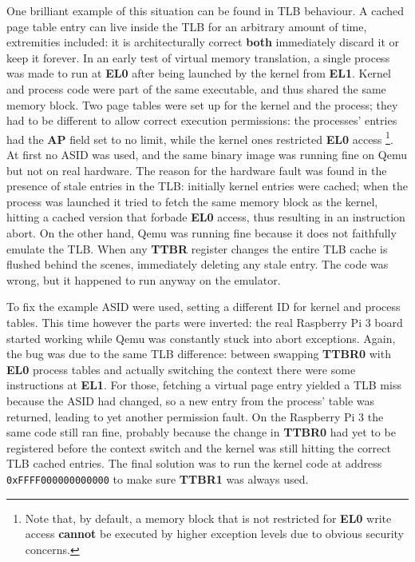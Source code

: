 \documentclass[12pt,a4paper,openright,twoside]{report}
\begin{document}
One brilliant example of this situation can be found in TLB behaviour. A cached
page table entry can live inside the TLB for an arbitrary amount of time, extremities
included: it is architecturally correct \textbf{both} immediately discard it or 
keep it forever. 
In an early test of virtual memory translation, a single process was made to run
at \textbf{EL0} after being launched by the kernel from \textbf{EL1}. Kernel and
process code were part of the same executable, and thus shared the same memory block.
Two page tables were set up for the kernel and the process; they had to be different
to allow correct execution permissions: the processes' entries had the \textbf{AP}
field set to no limit, while the kernel ones restricted \textbf{EL0} access 
\footnote{Note that, by default, a memory block that is not restricted for 
\textbf{EL0} write access \textbf{cannot} be executed by higher exception levels
due to obvious security concerns.}.
At first no ASID was used, and the same binary image was running fine on Qemu 
but not on real hardware. The reason for the hardware fault was found in the presence
of stale entries in the TLB: initially kernel entries were cached; when the process
was launched it tried to fetch the same memory block as the kernel, hitting a
cached version that forbade \textbf{EL0} access, thus resulting in an instruction
abort.
On the other hand, Qemu was running fine because it does not faithfully emulate
the TLB. When any \textbf{TTBR} register changes the entire TLB cache is flushed
behind the scenes, immediately deleting any stale entry.
The code was wrong, but it happened to run anyway on the emulator.

To fix the example ASID were used, setting a different ID for kernel and process
tables. This time however the parts were inverted: the real Raspberry Pi 3 board
started working while Qemu was constantly stuck into abort exceptions.
Again, the bug was due to the same TLB difference: between swapping \textbf{TTBR0}
with \textbf{EL0} process tables and actually switching the context there were 
some instructions at \textbf{EL1}. For those, fetching a virtual page entry 
yielded a TLB miss because the ASID had changed, so a new entry from the 
process' table was returned, leading to yet another permission fault.
On the Raspberry Pi 3 the same code still ran fine, probably because the change
in \textbf{TTBR0} had yet to be registered before the context switch and the
kernel was still hitting the correct TLB cached entries.
The final solution was to run the kernel code at address {\tt 0xFFFF000000000000}
to make sure \textbf{TTBR1} was always used.\\
\end{document}
